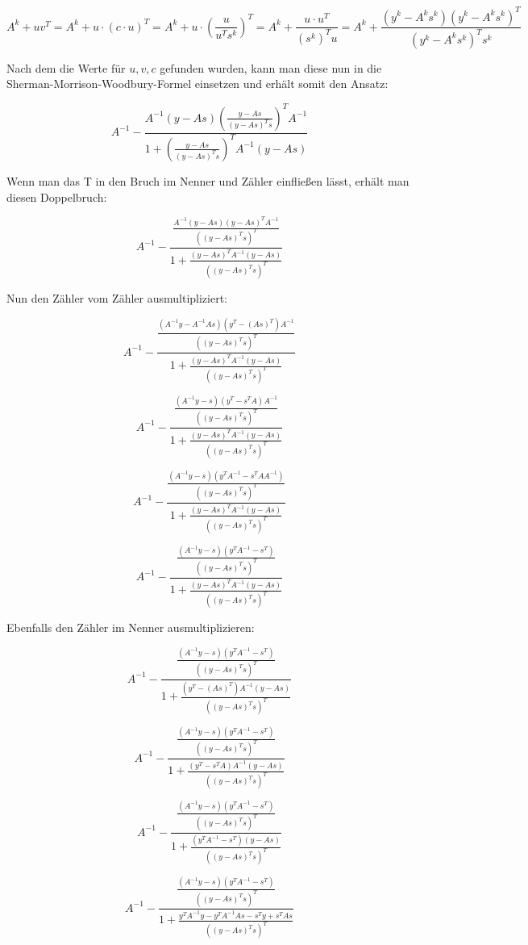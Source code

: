 \documentclass[a4paper, 12pt]{report}
\begin{document}
\begin{adjustwidth}{-19pt}{0pt}
$$A^k + uv^T = A^k + u \cdot (c \cdot u)^T = A^k + u \cdot (\frac{u}{u^Ts^k})^T = A^k + \frac{u\cdot u^T}{(s^k)^Tu} = A^k + \frac{(y^k - A^ks^k)(y^k - A^ks^k)^T}{(y^k - A^ks^k)^Ts^k}$$
\end{adjustwidth}

Nach dem die Werte für $u, v, c$ gefunden wurden, kann man diese nun in die Sherman-Morrison-Woodbury-Formel einsetzen und erhält somit den Ansatz:

$$ A^{-1} - \frac{ A^{-1}(y-As)\left(\frac{ y-As }{ (y-As)^Ts } \right)^TA^{-1} }{1 + \left(\frac{ y-As }{ (y-As)^Ts }\right)^TA^{-1}(y-As)}$$

Wenn man das T in den Bruch im Nenner und Zähler einfließen lässt, erhält man diesen Doppelbruch:

$$ A^{-1} - \frac{ \frac{A^{-1}(y-As)(y-As)^TA^{-1}}{\left( (y-As)^Ts\right)^T } }{1 + \frac{(y-As)^TA^{-1}(y-As)}{\left( (y-As)^Ts\right)^T}}$$

Nun den Zähler vom Zähler ausmultipliziert:

$$ A^{-1} - \frac{ \frac{ (A^{-1}y - A^{-1}As)(y^T-(As)^T)A^{-1} }{\left( (y-As)^Ts\right)^T } }{1 + \frac{(y-As)^TA^{-1}(y-As)}{\left( (y-As)^Ts\right)^T}}$$

$$ A^{-1} - \frac{ \frac{ (A^{-1}y - s)(y^T - s^TA)A^{-1} }{\left( (y-As)^Ts\right)^T } }{1 + \frac{(y-As)^TA^{-1}(y-As)}{\left( (y-As)^Ts\right)^T}}$$

$$ A^{-1} - \frac{ \frac{ (A^{-1}y - s)(y^TA^{-1} - s^TAA^{-1}) }{\left( (y-As)^Ts\right)^T } }{1 + \frac{(y-As)^TA^{-1}(y-As)}{\left( (y-As)^Ts\right)^T}}$$

$$ A^{-1} - \frac{ \frac{ (A^{-1}y-s)(y^TA^{-1}-s^T) }{\left( (y-As)^Ts\right)^T } }{1 + \frac{(y-As)^TA^{-1}(y-As)}{\left( (y-As)^Ts\right)^T}}$$

Ebenfalls den Zähler im Nenner ausmultiplizieren:

$$ A^{-1} - \frac{ \frac{ (A^{-1}y-s)(y^TA^{-1}-s^T) }{\left( (y-As)^Ts\right)^T } }{1 + \frac{ (y^T - (As)^T)A^{-1}(y - As) }{\left( (y-As)^Ts\right)^T}}$$

$$ A^{-1} - \frac{ \frac{ (A^{-1}y-s)(y^TA^{-1}-s^T) }{\left( (y-As)^Ts\right)^T } }{1 + \frac{ (y^T - s^TA)A^{-1}(y-As) }{\left( (y-As)^Ts\right)^T}}$$

$$ A^{-1} - \frac{ \frac{ (A^{-1}y-s)(y^TA^{-1}-s^T) }{\left( (y-As)^Ts\right)^T } }{1 + \frac{ (y^TA^{-1} - s^T)(y - As) }{\left( (y-As)^Ts\right)^T}}$$

$$ A^{-1} - \frac{ \frac{ (A^{-1}y-s)(y^TA^{-1}-s^T) }{\left( (y-As)^Ts\right)^T } }{1 + \frac{ y^TA^{-1}y - y^TA^{-1}As - s^Ty + s^TAs }{\left( (y-As)^Ts\right)^T}}$$
\end{document}
